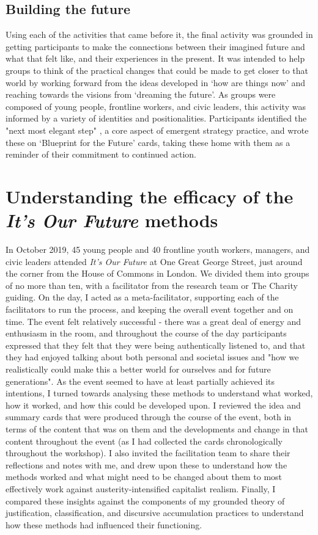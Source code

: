 \subsection{Building the future}
Using each of the activities that came before it, the final activity was grounded in getting participants to make the connections between their imagined future and what that felt like, and their experiences in the present. It was intended to help groups to think of the practical changes that could be made to get closer to that world by working forward from the ideas developed in `how are things now' and reaching towards the visions from `dreaming the future'. As groups were composed of young people, frontline workers, and civic leaders, this activity was informed by a variety of identities and positionalities. Participants identified the "next most elegant step" \citep[220]{brown_emergent_2017}, a core aspect of emergent strategy practice, and wrote these on ‘Blueprint for the Future’ cards, taking these home with them as a reminder of their commitment to continued action. 

\section{Understanding the efficacy of the \textit{It's Our Future} methods}

In October 2019, 45 young people and 40 frontline youth workers, managers, and civic leaders attended \textit{It's Our Future} at One Great George Street, just around the corner from the House of Commons in London. We divided them into groups of no more than ten, with a facilitator from the research team or The Charity guiding. On the day, I acted as a meta-facilitator, supporting each of the facilitators to run the process, and keeping the overall event together and on time. The event felt relatively successful - there was a great deal of energy and enthusiasm in the room, and throughout the course of the day participants expressed that they felt that they were being authentically listened to, and that they had enjoyed talking about both personal and societal issues and "how we realistically could make this a better world for ourselves and for future generations". As the event seemed to have at least partially achieved its intentions, I turned towards analysing these methods to understand what worked, how it worked, and how this could be developed upon. I reviewed the idea and summary cards that were produced through the course of the event, both in terms of the content that was on them and the developments and change in that content throughout the event (as I had collected the cards chronologically throughout the workshop). I also invited the facilitation team to share their reflections and notes with me, and drew upon these to understand how the methods worked and what might need to be changed about them to most effectively work against austerity-intensified capitalist realism. Finally, I compared these insights against the components of my grounded theory of justification, classification, and discursive accumulation practices to understand how these methods had influenced their functioning. 

